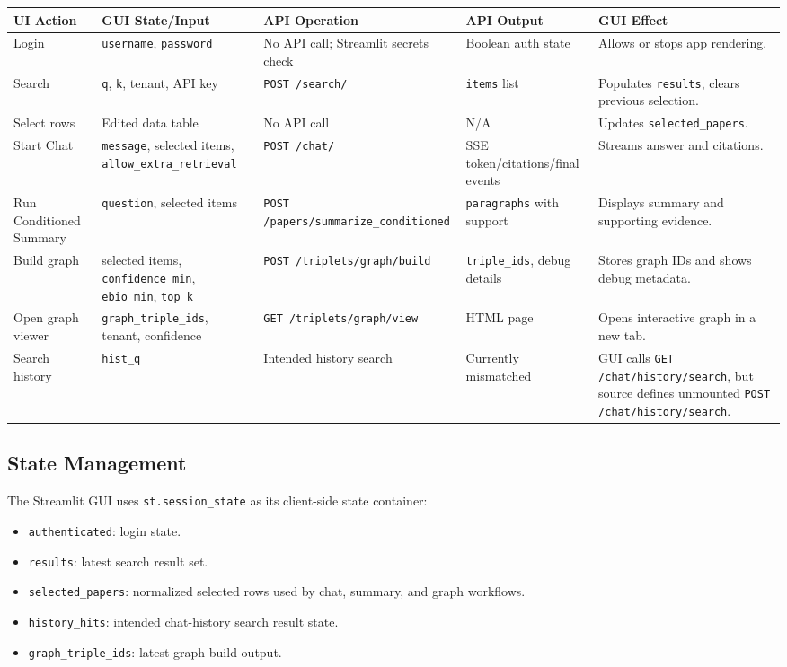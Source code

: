 \documentclass[10pt,letterpaper]{article}
\begin{document}
\begin{scriptsize}
\begin{longtable}{>{\raggedright\arraybackslash}p{1.34in}>{\raggedright\arraybackslash}p{1.34in}>{\raggedright\arraybackslash}p{1.34in}>{\raggedright\arraybackslash}p{1.34in}>{\raggedright\arraybackslash}p{1.34in}}
UI Action & GUI State/Input & API Operation & API Output & GUI Effect \\
\hline
Login & \texttt{username}, \texttt{password} & No API call; Streamlit secrets check & Boolean auth state & Allows or stops app rendering. \\
Search & \texttt{q}, \texttt{k}, tenant, API key & \texttt{POST /search/} & \texttt{items} list & Populates \texttt{results}, clears previous selection. \\
Select rows & Edited data table & No API call & N/A & Updates \texttt{selected\_papers}. \\
Start Chat & \texttt{message}, selected items, \texttt{allow\_extra\_retrieval} & \texttt{POST /chat/} & SSE token/citations/final events & Streams answer and citations. \\
Run Conditioned Summary & \texttt{question}, selected items & \texttt{POST /papers/summarize\_conditioned} & \texttt{paragraphs} with support & Displays summary and supporting evidence. \\
Build graph & selected items, \texttt{confidence\_min}, \texttt{ebio\_min}, \texttt{top\_k} & \texttt{POST /triplets/graph/build} & \texttt{triple\_ids}, debug details & Stores graph IDs and shows debug metadata. \\
Open graph viewer & \texttt{graph\_triple\_ids}, tenant, confidence & \texttt{GET /triplets/graph/view} & HTML page & Opens interactive graph in a new tab. \\
Search history & \texttt{hist\_q} & Intended history search & Currently mismatched & GUI calls \texttt{GET /chat/history/search}, but source defines unmounted \texttt{POST /chat/history/search}. \\
\end{longtable}
\end{scriptsize}

\subsection{State Management}

The Streamlit GUI uses \texttt{st.session\_state} as its client-side state container:

\begin{itemize}
\item \texttt{authenticated}: login state.
\item \texttt{results}: latest search result set.
\item \texttt{selected\_papers}: normalized selected rows used by chat, summary, and graph workflows.
\item \texttt{history\_hits}: intended chat-history search result state.
\item \texttt{graph\_triple\_ids}: latest graph build output.
\end{itemize}
\end{document}

